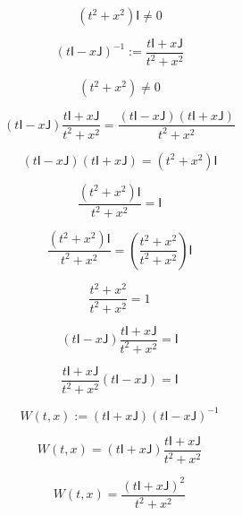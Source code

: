 \documentclass[12pt]{article}
\begin{document}
\begin{equation}
(t^2+x^2)\mathsf{I}\neq 0
\end{equation}

\begin{equation}
(t\mathsf{I}-x\mathsf{J})^{-1}:=\frac{t\mathsf{I}+x\mathsf{J}}{t^2+x^2}
\end{equation}

\begin{equation}
(t^2+x^2)\neq 0
\end{equation}

\begin{equation}
(t\mathsf{I}-x\mathsf{J})\frac{t\mathsf{I}+x\mathsf{J}}{t^2+x^2}=\frac{(t\mathsf{I}-x\mathsf{J})(t\mathsf{I}+x\mathsf{J})}{t^2+x^2}
\end{equation}

\begin{equation}
(t\mathsf{I}-x\mathsf{J})(t\mathsf{I}+x\mathsf{J})=(t^2+x^2)\mathsf{I}
\end{equation}

\begin{equation}
\frac{(t^2+x^2)\mathsf{I}}{t^2+x^2}=\mathsf{I}
\end{equation}

\begin{equation}
\frac{(t^2+x^2)\mathsf{I}}{t^2+x^2}=\left(\frac{t^2+x^2}{t^2+x^2}\right)\mathsf{I}
\end{equation}

\begin{equation}
\frac{t^2+x^2}{t^2+x^2}=1
\end{equation}

\begin{equation}
(t\mathsf{I}-x\mathsf{J})\frac{t\mathsf{I}+x\mathsf{J}}{t^2+x^2}=\mathsf{I}
\end{equation}

\begin{equation}
\frac{t\mathsf{I}+x\mathsf{J}}{t^2+x^2}(t\mathsf{I}-x\mathsf{J})=\mathsf{I}
\end{equation}

\begin{equation}
W(t,x):=(t\mathsf{I}+x\mathsf{J})(t\mathsf{I}-x\mathsf{J})^{-1}
\end{equation}

\begin{equation}
W(t,x)=(t\mathsf{I}+x\mathsf{J})\frac{t\mathsf{I}+x\mathsf{J}}{t^2+x^2}
\end{equation}

\begin{equation}
W(t,x)=\frac{(t\mathsf{I}+x\mathsf{J})^2}{t^2+x^2}
\end{equation}
\end{document}
